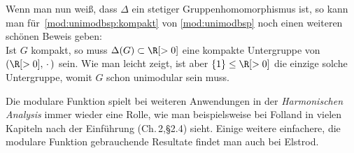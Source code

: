 Wenn man nun weiß, dass $\Delta$ ein stetiger Gruppenhomomorphismus ist, so kann
man für~\ref{mod:unimodbsp:kompakt} von \cref{mod:unimodbsp} noch einen weiteren
schönen Beweis geben:\\
Ist $G$ kompakt, so muss $\Delta(G)\subset\R[>0]$ eine kompakte Untergruppe von
$(\R[>0],\,\cdot\,)$ sein. Wie man leicht zeigt, ist aber $\{1\}\leq\R[>0]$ die
einzige solche Untergruppe, womit $G$ schon unimodular sein muss.

\bigskip
Die modulare Funktion spielt bei weiteren Anwendungen in der \emph{Harmonischen
Analysis} immer wieder eine Rolle, wie man beispielsweise bei
Folland\cite{bookc:folland95} in vielen Kapiteln nach der Einführung
(Ch.\,2,\;\S2.4) sieht. Einige weitere einfachere, die modulare Funktion
gebrauchende Resultate findet man auch bei
Elstrod\cite[Kap.\,VIII,\;\S3,.]{bookc:elstrod11}.
















